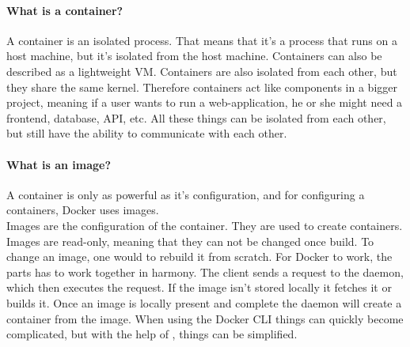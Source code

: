 \paragraph{\textbf{What is a container?}}
A container\cite{docker-concepts} is an isolated process. 
That means that it's a process that runs on a host machine, but it's isolated from the host machine.
Containers can also be described as a lightweight \ac{VM}. Containers are also isolated from each other, but they share the same kernel.
Therefore containers act like components in a bigger project, meaning if a user wants to run a web-application, he or she might need a frontend, database, \ac{API}, etc.
All these things can be isolated from each other, but still have the ability to communicate with each other.
\paragraph{\textbf{What is an image?}}
A container is only as powerful as it's configuration, and for configuring a containers,
Docker uses images\cite{docker-concepts}.\\
Images are the configuration of the container.
They are used to create containers. Images are read-only, meaning that they can not be changed once build.
To change an image, one would to rebuild it from scratch.
For Docker to work, the parts has to work together in harmony. The client sends a request to the daemon, which then executes the request.
If the image isn't stored locally it fetches it or builds it. Once an image is locally present and complete the daemon  
will create a container from the image.
When using the Docker CLI things can quickly become complicated, but with the help of , things can be simplified.
